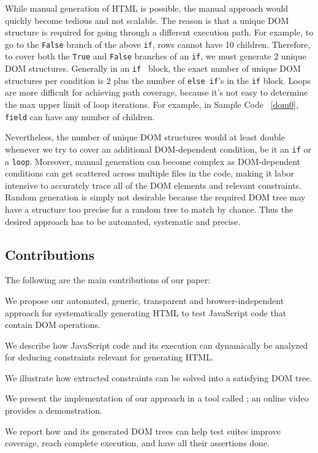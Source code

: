 While manual generation of HTML is possible, the manual approach would quickly become tedious and not scalable.  
The reason is that a unique DOM structure is required for going through a different execution path.
For example, to go to the {\tt False} branch of the above {\tt if}, rows cannot have 10 children.
Therefore, to cover both the {\tt True} and {\tt False} branches of an {\tt if}, we must generate 2 unique DOM structures.  Generally in an {\tt if } block, the exact number of unique DOM structures per condition is 2 plus the number of {\tt else if}'s in the {\tt if} block.  Loops are more difficult for achieving path coverage, because it's not easy to determine the max upper limit of loop iterations.  For example, in Sample Code ~\ref{dom0}, {\tt field} can have any number of children.

Nevertheless, the number of unique DOM structures would at least double whenever we try to cover an additional DOM-dependent condition, be it an {\tt if} or a {\tt loop}.  
Moreover, manual generation can become complex as DOM-dependent conditions can get scattered across multiple files in the code, making it labor intensive to accurately trace all of the DOM elements and relevant constraints.  
Random generation is simply not desirable because the required DOM tree may have a structure too precise for a random tree to match by chance.  
Thus the desired approach has to be automated, systematic and precise.


\subsection{Contributions}
The following are the main contributions of our paper:
\begin {compactitem}
\item We propose our automated, generic, transparent and browser-independent approach for systematically generating HTML to test JavaScript code that contain DOM operations.
\item We describe how JavaScript code and its execution can dynamically be analyzed for deducing constraints relevant for generating HTML.
\item We illustrate how extracted constraints can be solved into a satisfying DOM tree.
\item We present the implementation of our approach in a tool called \tool; an online video provides a demonstration.
\item We report how \tool and its generated DOM trees can help test suites improve coverage, reach complete execution, and have all their assertions done.
\end {compactitem}

